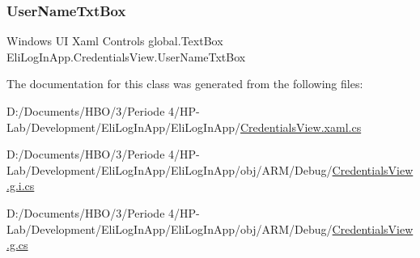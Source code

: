 \subsubsection{\texorpdfstring{User\+Name\+Txt\+Box}{UserNameTxtBox}}
{\footnotesize\ttfamily Windows UI Xaml Controls global.\+Text\+Box Eli\+Log\+In\+App.\+Credentials\+View.\+User\+Name\+Txt\+Box\hspace{0.3cm}{\ttfamily [private]}}



The documentation for this class was generated from the following files\+:\begin{DoxyCompactItemize}
\item 
D\+:/\+Documents/\+H\+B\+O/3/\+Periode 4/\+H\+P-\/\+Lab/\+Development/\+Eli\+Log\+In\+App/\+Eli\+Log\+In\+App/\hyperlink{_credentials_view_8xaml_8cs}{Credentials\+View.\+xaml.\+cs}\item 
D\+:/\+Documents/\+H\+B\+O/3/\+Periode 4/\+H\+P-\/\+Lab/\+Development/\+Eli\+Log\+In\+App/\+Eli\+Log\+In\+App/obj/\+A\+R\+M/\+Debug/\hyperlink{_a_r_m_2_debug_2_credentials_view_8g_8i_8cs}{Credentials\+View.\+g.\+i.\+cs}\item 
D\+:/\+Documents/\+H\+B\+O/3/\+Periode 4/\+H\+P-\/\+Lab/\+Development/\+Eli\+Log\+In\+App/\+Eli\+Log\+In\+App/obj/\+A\+R\+M/\+Debug/\hyperlink{_a_r_m_2_debug_2_credentials_view_8g_8cs}{Credentials\+View.\+g.\+cs}\end{DoxyCompactItemize}

